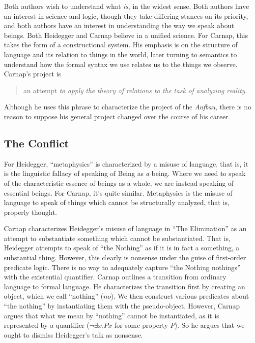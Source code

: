 \documentclass[leqno, 12pt]{turabian-researchpaper}
\begin{document}
	Both authors wish to understand what \emph{is}, in the widest sense. Both authors
	have an interest in science and logic, though they take differing stances on
	its priority, and both authors have an interest in understanding the way we speak
	about beings. Both Heidegger and Carnap believe in a unified science. For Carnap,
	this takes the form of a constructional system. His emphasis is on the structure
	of language and its relation to things in the world, later turning to
	semantics to understand how the formal syntax we use relates us to the things
	we observe. Carnap's project is \blockquote[{\cite[7]{carnap2003}}]{an attempt \emph{to apply the theory of relations to the task of analyzing reality.}}
	Although he uses this phrase to characterize the project of the \textit{Aufbau},
	there is no reason to suppose his general project changed over the course of his
	career.

	\subsection{The Conflict}

	For Heidegger, \enquote{metaphysics} is characterized by a misuse of language,
	that is, it is the linguistic fallacy of speaking of Being as \emph{a} being.
	Where we need to speak of the characteristic essence of beings as a whole, we are
	instead speaking of essential beings. For Carnap, it's quite similar.
	Metaphysics is the misuse of language to speak of things which cannot be
	structurally analyzed, that is, properly thought.

	Carnap characterizes Heidegger's misuse of language in \enquote{The Elimination}
	as an attempt to substantiate something which cannot be substantiated. That is,
	Heidegger attempts to speak of \enquote{the Nothing} as if it is in fact a
	something, a substantial thing. However, this clearly is nonsense under the guise
	of first-order predicate logic. There is no way to adequately capture \enquote{the Nothing nothings}
	with the existential quantifier. Carnap outlines a transition from ordinary
	language to formal language. He characterizes the transition first by creating
	an object, which we call \enquote{nothing} ($no$). We then construct various
	predicates about \enquote{the nothing} by instantiating them with the pseudo-object.
	However, Carnap argues that what we mean by \enquote{nothing} cannot be
	instantiated, as it is represented by a quantifier ($\neg\exists x.Px$ for
	some property $P$). So he argues that we ought to dismiss Heidegger's talk as
	nonsense.
\end{document}
